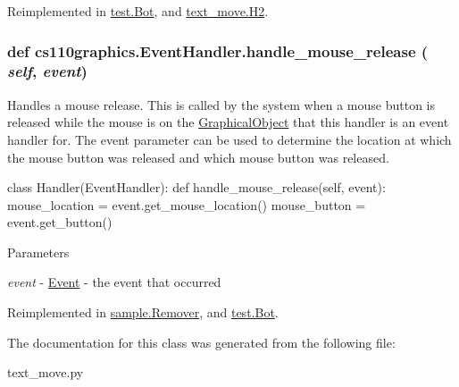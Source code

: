 Reimplemented in \hyperlink{classtest_1_1Bot_a970422a4391cc2b9ff89a2e42063bb6e}{test.Bot}, and \hyperlink{classtext__move_1_1H2_a13611a7fe23eefc92b40ff3874e026bd}{text\_\-move.H2}.\hypertarget{classcs110graphics_1_1EventHandler_a320a7dbf68d37e0101b237bff1713088}{
\subsubsection[{handle\_\-mouse\_\-release}]{\setlength{\rightskip}{0pt plus 5cm}def cs110graphics.EventHandler.handle\_\-mouse\_\-release ( {\em self}, \/   {\em event})}}
\label{classcs110graphics_1_1EventHandler_a320a7dbf68d37e0101b237bff1713088}


Handles a mouse release. This is called by the system when a mouse button is released while the mouse is on the \hyperlink{classcs110graphics_1_1GraphicalObject}{GraphicalObject} that this handler is an event handler for. The event parameter can be used to determine the location at which the mouse button was released and which mouse button was released. 
\begin{DoxyCode}
 class Handler(EventHandler):
     def handle_mouse_release(self, event):
         mouse_location = event.get_mouse_location()
         mouse_button = event.get_button()
\end{DoxyCode}
 
\begin{DoxyParams}{Parameters}
\item[{\em event}]-\/ \hyperlink{classcs110graphics_1_1Event}{Event} -\/ the event that occurred \end{DoxyParams}


Reimplemented in \hyperlink{classsample_1_1Remover_a84484de500f08402e582c126432e0cf1}{sample.Remover}, and \hyperlink{classtest_1_1Bot_a18fc05b6e2c1e42e1b6c639f4844a059}{test.Bot}.

The documentation for this class was generated from the following file:\begin{DoxyCompactItemize}
\item 
text\_\-move.py\end{DoxyCompactItemize}
